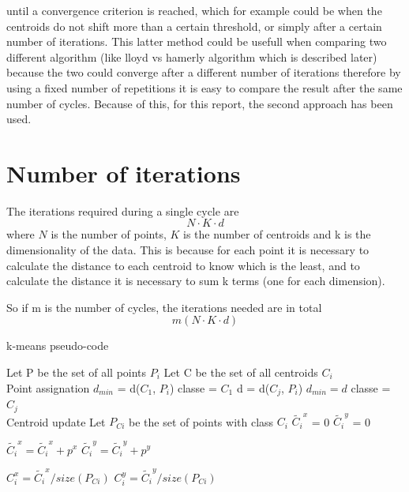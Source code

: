 \documentclass{report}
\begin{document}
\begin{minipage}[b]{0.48\textwidth}
  until a convergence criterion is reached, which for example could be when the centroids do not shift more than a certain threshold, or simply after a certain number of iterations. This latter method could be usefull when comparing two different algorithm (like lloyd vs hamerly algorithm which is described later)  because the two could converge after a different number of iterations therefore by using a fixed number of repetitions it is easy to compare the result after the same number of cycles. Because of this, for this report, the second approach has been used.

  \section*{Number of iterations}
  The iterations required during a single cycle are \[N\cdot K\cdot d\] where $N$ is the number of points, $K$ is the number of centroids and k is the dimensionality of the data. This is because for each point it is necessary to calculate the distance to each centroid to know which is the least, and to calculate the distance it is necessary to sum k terms (one for each dimension).

  So if m is the number of cycles, the iterations needed are in total
  \begin{equation}
    m(N\cdot K\cdot d)
  \end{equation}

  \begin{algorithm}[H]
    \caption{k-means pseudo-code}\label{alg:cap}
    \begin{algorithmic}
        \State Let P be the set of all points $P_i$
        \State Let C be the set of all centroids $C_i$
        \\
        \Comment Point assignation
            \State $d_{min}$ = d($C_1$, $P_i$)
            \State classe = $C_1$
                \State d = d($C_j$, $P_i$)
                    \State $d_{min} = d$
                    \State classe = $C_j$
                \EndIf
            \EndFor
        \EndFor
        \\
        \Comment Centroid update
        \State Let $P_{Ci}$ be the set of points with class $C_i$
            \State $\tilde{C_i}^x$ = 0
            \State $\tilde{C_i}^y$ = 0

                \State  $\tilde{C_i}^x = \tilde{C_i}^x + p^x$
                \State  $\tilde{C_i}^y = \tilde{C_i}^y + p^y$
            \EndFor

            \State $C_i^x = \tilde{C_i}^x/size(P_{Ci})$
            \State $C_i^y = \tilde{C_i}^y/size(P_{Ci})$
        \EndFor
      \EndFor
    \end{algorithmic}
\end{algorithm}
\end{minipage}
\hspace{0.1in}
\begin{minipage}[b]{0.48\textwidth}

\end{minipage}
\end{document}
